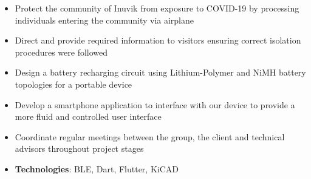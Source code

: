 \documentclass[10pt, letterpaper, ragged2e, withhyper]{altacv}
\begin{document}
\begin{paracol}{2}
            \divider
            
            \begin{itemize}
                \item Protect the community of Inuvik from exposure to COVID-19 by processing individuals entering the community via airplane 
                \item Direct and provide required information to visitors ensuring correct isolation procedures were followed
            \end{itemize}

            
    
    \begin{itemize}
        \item Design a battery recharging circuit using Lithium-Polymer and NiMH battery topologies for a portable device 
        \item Develop a smartphone application to interface with our device to provide a more fluid and 
        controlled user interface
        \item Coordinate regular meetings between the group, the client and technical advisors throughout project stages   
        \item \textbf{Technologies}: BLE, Dart, Flutter, KiCAD
    \end{itemize}

\switchcolumn

     \\
    

\end{paracol}
\end{document}
